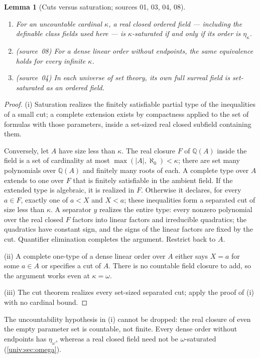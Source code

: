 \documentclass[11pt,letterpaper]{article}
\numberwithin{equation}{section}
\newtheorem{lemma}[lemma]{Lemma}
\theoremstyle{definition}
\theoremstyle{remark}
\newcommand{\Q}{\mathbb Q}
\newcommand{\abs}[1]{\lvert#1\rvert}
\begin{document}
\begin{lemma}[Cuts versus saturation; sources 01, 03, 04, 08]\label{univ:lem:RCFsat}
\begin{enumerate}[label=\textnormal{(\roman*)}]
\item For an uncountable cardinal $\kappa$, a real closed ordered field ---
including the definable class fields used here --- is $\kappa$-saturated if
and only if its order is $\eta_\kappa$.
\item \textup{(source~08)} For a dense linear order without endpoints, the
same equivalence holds for every infinite $\kappa$.
\item \textup{(source~04)} In each universe of set theory, its own full
surreal field is set-saturated as an ordered field.
\end{enumerate}
\end{lemma}
\begin{proof}
(i) Saturation realizes the finitely satisfiable partial type of the
inequalities of a small cut; a complete extension exists by compactness
applied to the set of formulas with those parameters, inside a set-sized real
closed subfield containing them.

Conversely, let $A$ have size less than $\kappa$. The real closure $F$ of
$\Q(A)$ inside the field is a set of cardinality at most
$\max(\abs A,\aleph_0)<\kappa$; there are set many polynomials over $\Q(A)$
and finitely many roots of each. A complete type over $A$ extends to one over
$F$ that is finitely satisfiable in the ambient field. If the extended type
is algebraic, it is realized in $F$. Otherwise it declares, for every $a\in F$,
exactly one of $a<X$ and $X<a$; these inequalities form a separated cut of
size less than $\kappa$. A separator $y$ realizes the entire type: every
nonzero polynomial over the real closed $F$ factors into linear factors and
irreducible quadratics; the quadratics have constant sign, and the signs of the
linear factors are fixed by the cut. Quantifier elimination completes the
argument. Restrict back to $A$.

(ii) A complete one-type of a dense linear order over $A$ either says $X=a$
for some $a\in A$ or specifies a cut of $A$. There is no countable field
closure to add, so the argument works even at $\kappa=\omega$.

(iii) The cut theorem realizes every set-sized separated cut; apply the proof
of (i) with no cardinal bound.
\end{proof}

The uncountability hypothesis in (i) cannot be dropped: the real closure of
even the empty parameter set is countable, not finite. Every dense order
without endpoints has $\eta_\omega$, whereas a real closed field need not be
$\omega$-saturated (\cref{univ:sec:omega}).
\end{document}
